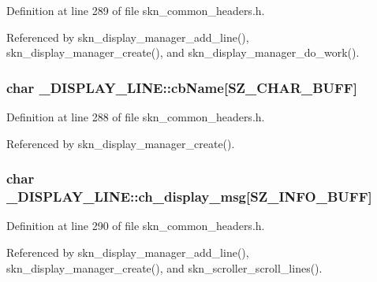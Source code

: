 Definition at line 289 of file skn\+\_\+common\+\_\+headers.\+h.



Referenced by skn\+\_\+display\+\_\+manager\+\_\+add\+\_\+line(), skn\+\_\+display\+\_\+manager\+\_\+create(), and skn\+\_\+display\+\_\+manager\+\_\+do\+\_\+work().

\subsubsection[{\texorpdfstring{cb\+Name}{cbName}}]{\setlength{\rightskip}{0pt plus 5cm}char \+\_\+\+D\+I\+S\+P\+L\+A\+Y\+\_\+\+L\+I\+N\+E\+::cb\+Name\mbox{[}{\bf S\+Z\+\_\+\+C\+H\+A\+R\+\_\+\+B\+U\+FF}\mbox{]}}\hypertarget{struct___d_i_s_p_l_a_y___l_i_n_e_a3a374d209578adb1d4cea933756fb14a}{}\label{struct___d_i_s_p_l_a_y___l_i_n_e_a3a374d209578adb1d4cea933756fb14a}


Definition at line 288 of file skn\+\_\+common\+\_\+headers.\+h.



Referenced by skn\+\_\+display\+\_\+manager\+\_\+create().

\subsubsection[{\texorpdfstring{ch\+\_\+display\+\_\+msg}{ch_display_msg}}]{\setlength{\rightskip}{0pt plus 5cm}char \+\_\+\+D\+I\+S\+P\+L\+A\+Y\+\_\+\+L\+I\+N\+E\+::ch\+\_\+display\+\_\+msg\mbox{[}{\bf S\+Z\+\_\+\+I\+N\+F\+O\+\_\+\+B\+U\+FF}\mbox{]}}\hypertarget{struct___d_i_s_p_l_a_y___l_i_n_e_ae5fae9b599281d1d3f619b6e402e7c2c}{}\label{struct___d_i_s_p_l_a_y___l_i_n_e_ae5fae9b599281d1d3f619b6e402e7c2c}


Definition at line 290 of file skn\+\_\+common\+\_\+headers.\+h.



Referenced by skn\+\_\+display\+\_\+manager\+\_\+add\+\_\+line(), skn\+\_\+display\+\_\+manager\+\_\+create(), and skn\+\_\+scroller\+\_\+scroll\+\_\+lines().

